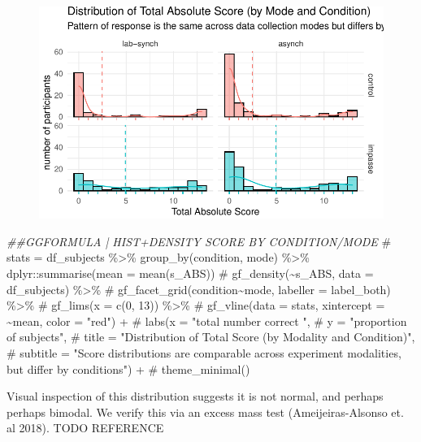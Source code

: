 \documentclass[
  letterpaper,
  DIV=11,
  numbers=noendperiod]{scrreprt}
\newenvironment{Shaded}{\begin{snugshade}}{\end{snugshade}}
\newcommand{\CommentTok}[1]{\textcolor[rgb]{0.37,0.37,0.37}{#1}}
\newcommand{\DocumentationTok}[1]{\textcolor[rgb]{0.37,0.37,0.37}{\textit{#1}}}
\newcommand{\FunctionTok}[1]{\textcolor[rgb]{0.28,0.35,0.67}{#1}}
\newcommand{\NormalTok}[1]{\textcolor[rgb]{0.00,0.23,0.31}{#1}}
\newcommand{\SpecialCharTok}[1]{\textcolor[rgb]{0.37,0.37,0.37}{#1}}
\begin{document}
\begin{figure}[H]

{\centering \includegraphics{analysis/SGC3A/3_sgc3A_description_files/figure-pdf/VIS-SUBJ-ABS-2.pdf}

}

\end{figure}

\begin{Shaded}
\begin{Highlighting}[]
\DocumentationTok{\#\#GGFORMULA | HIST+DENSITY SCORE BY CONDITION/MODE}
\CommentTok{\# stats = df\_subjects \%\textgreater{}\% group\_by(condition, mode) \%\textgreater{}\% dplyr::summarise(mean = mean(s\_ABS))}
\CommentTok{\# gf\_density(\textasciitilde{}s\_ABS, data = df\_subjects) \%\textgreater{}\% }
\CommentTok{\#   gf\_facet\_grid(condition\textasciitilde{}mode, labeller = label\_both) \%\textgreater{}\% }
\CommentTok{\#   gf\_lims(x = c(0, 13)) \%\textgreater{}\% }
\CommentTok{\#   gf\_vline(data = stats, xintercept = \textasciitilde{}mean, color = "red") +}
\CommentTok{\#   labs(x = "total number correct ",}
\CommentTok{\#        y = "proportion of subjects",}
\CommentTok{\#        title = "Distribution of Total Score (by Modality and Condition)",}
\CommentTok{\#        subtitle = "Score distributions are comparable across experiment modalities, but differ by conditions") + }
\CommentTok{\#   theme\_minimal()}
\end{Highlighting}
\end{Shaded}

Visual inspection of this distribution suggests it is not normal, and
perhaps perhaps bimodal. We verify this via an excess mass test
(Ameijeiras-Alsonso et. al 2018). TODO REFERENCE

\begin{Shaded}
\end{Shaded}
\end{document}
